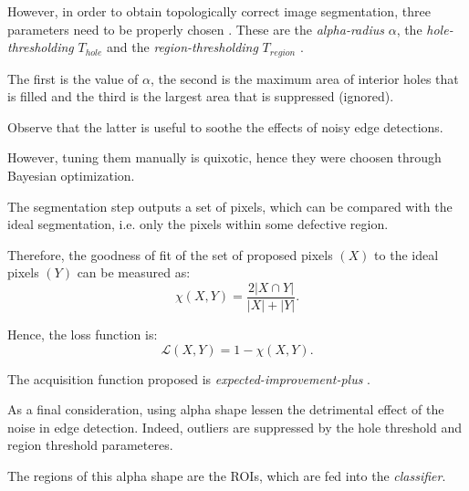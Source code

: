         \par{
            However, in order to obtain topologically correct image segmentation, three parameters need to be properly chosen \cite{springer:10.1007/11907350_46}. These are the \emph{alpha-radius} $\alpha$, the \emph{hole-thresholding} $T_{hole}$ and the \emph{region-thresholding} $T_{region}$ \cite{matlab:alpha-shape}.
        }
        \par{
            The first is the value of $\alpha$, the second is the maximum area of interior holes that is filled and the third is the largest area that is suppressed (ignored).
        }
        \par{
            Observe that the latter is useful to soothe the effects of noisy edge detections.
        }
        \par{
            However, tuning them manually is quixotic, hence they were choosen through Bayesian optimization.
        }
        \par{
            The segmentation step outputs a set of pixels, which can be compared with the ideal segmentation, i.e. only the pixels within some defective region.
        }
        \par{
            Therefore, the goodness of fit of the set of proposed pixels $\left(X\right)$ to the ideal pixels $\left(Y\right)$ can be measured as:
            \begin{equation*}
                \chi\left(X, Y\right) = \frac{2 \lvert X \cap Y \rvert}{\lvert X \rvert + \lvert Y \rvert}.
            \end{equation*}
        }
        \par{
            Hence, the loss function is:
            \begin{equation*}
                \mathcal{L}\left(X, Y\right) = 1 - \chi\left(X, Y\right).
            \end{equation*}
        }
        \par{
            The acquisition function proposed is \emph{expected-improvement-plus} \cite{matlab:acquisition}.
        }
        \par{
            As a final consideration, using alpha shape lessen the detrimental effect of the noise in edge detection. Indeed, outliers are suppressed by the hole threshold and region threshold parameteres.
        }
        \par{
            The regions of this alpha shape are the ROIs, which are fed into the \emph{classifier}.
        }
